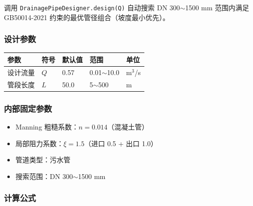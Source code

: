 \documentclass[12pt,a4paper]{ctexart}
\begin{document}
调用 \texttt{DrainagePipeDesigner.design(Q)} 自动搜索 DN 300$\sim$1500 mm 范围内满足 GB50014-2021 约束的最优管径组合（坡度最小优先）。

\subsubsection{设计参数}
\begin{table}[h]
\centering
\begin{tabular}{@{}lllll@{}}
\toprule
参数 & 符号 & 默认值 & 范围 & 单位 \\
\midrule
设计流量 & $Q$ & 0.57 & 0.01$\sim$10.0 & m$^3$/s \\
管段长度 & $L$ & 50.0 & 5$\sim$500 & m \\
\bottomrule
\end{tabular}
\end{table}

\subsubsection{内部固定参数}
\begin{itemize}[itemsep=0pt]
    \item Manning 粗糙系数：$n = 0.014$（混凝土管）
    \item 局部阻力系数：$\xi = 1.5$（进口 0.5 + 出口 1.0）
    \item 管道类型：污水管
    \item 搜索范围：DN 300$\sim$1500 mm
\end{itemize}

\subsubsection{计算公式}
\end{document}
